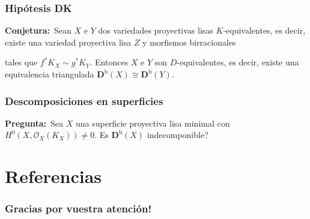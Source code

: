 \documentclass[12pt]{beamer}
\begin{document}
\begin{frame}
  \frametitle{Hipótesis DK}
  \textbf{Conjetura:}~Sean $X$ e $Y$ dos variedades proyectivas lisas $K$-equivalentes, es decir, existe una variedad proyectiva lisa $Z$ y morfismos birracionales
  \begin{center}
  \end{center}
  tales que $f^{*}K_{X} \sim g^{*}K_{Y}$.
  \pause
  Entonces $X$ e $Y$ son $D$-equivalentes, es decir, existe una equivalencia triangulada $\mathbf{D}^{\mathrm{b}}(X) \cong \mathbf{D}^{\mathrm{b}}(Y)$.
\end{frame}

\begin{frame}
  \frametitle{Descomposiciones en superficies}
  \textbf{Pregunta:}~Sea $X$ una superficie proyectiva lisa minimal con $H^{0}(X,\mathscr{O}_{X}(K_{X})) \neq 0$.
  Es $\mathbf{D}^{\mathrm{b}}(X)$ indecomponible?
\end{frame}

\section{Referencias}

\begin{frame}
  \frametitle{Gracias por vuestra atención!}
  \nocite{gm03}
  \nocite{huy06}
  \nocite{kaw17}
  \nocite{mat02}
  \printbibliography[heading=none]
\end{frame}
\end{document}

